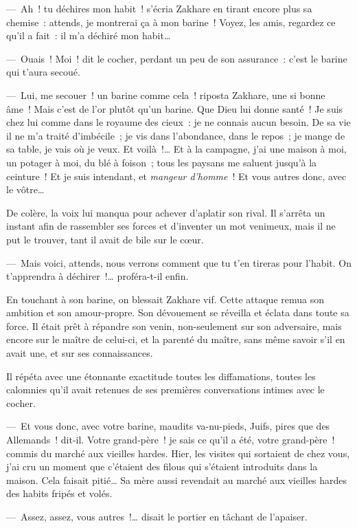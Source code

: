 \documentclass[french,twoside]{book} %
\begin{document}
— Ah ! tu déchires mon habit ! s’écria Zakhare en tirant encore plus sa chemise : attends, je montrerai ça à mon barine ! Voyez, les amis, regardez ce qu’il a fait : il m’a déchiré mon habit…\par
— Ouais ! Moi ! dit le cocher, perdant un peu de son assurance : c’est le barine qui t’aura secoué.\par
— Lui, me secouer ! un barine comme cela ! riposta Zakhare, une si bonne âme ! Mais c’est de l’or plutôt qu’un barine. Que Dieu lui donne santé ! Je suis chez lui comme dans le royaume des cieux : je ne connais aucun besoin. De sa vie il ne m’a traité d’imbécile ; je vis dans l’abondance, dans le repos ; je mange de sa table, je vais où je veux. Et voilà !… Et à la campagne, j’ai une maison à moi, un potager à moi, du blé à foison ; tous les paysans me saluent jusqu’à la ceinture ! Et je suis intendant, et \emph{mangeur d’homme} ! Et vous autres donc, avec le vôtre…\par
De colère, la voix lui manqua pour achever d’aplatir son rival. Il s’arrêta un instant afin de rassembler ses forces et d’inventer un mot venimeux, mais il ne put le trouver, tant il avait de bile sur le cœur.\par
— Mais voici, attends, nous verrons comment que tu t’en tireras pour l’habit. On t’apprendra à déchirer !… proféra-t-il enfin.\par
En touchant à son barine, on blessait Zakhare vif. Cette attaque remua son ambition et son amour-propre. Son dévouement se réveilla et éclata dans toute sa force. Il était prêt à répandre son venin, non-seulement sur son adversaire, mais encore sur le maître de celui-ci, et la parenté du maître, sans même savoir s’il en avait une, et sur ses connaissances.\par
Il répéta avec une étonnante exactitude toutes les diffamations, toutes les calomnies qu’il avait retenues de ses premières conversations intimes avec le cocher.\par
— Et vous donc, avec votre barine, maudits va-nu-pieds, Juifs, pires que des Allemands ! dit-il. Votre grand-père ! je sais ce qu’il a été, votre grand-père ! commis du marché aux vieilles hardes. Hier, les visites qui sortaient de chez vous, j’ai cru un moment que c’étaient des filous qui s’étaient introduits dans la maison. Cela faisait pitié… Sa mère aussi revendait au marché aux vieilles hardes des habits fripés et volés.\par
— Assez, assez, vous autres !… disait le portier en tâchant de l’apaiser.\par
\end{document}
